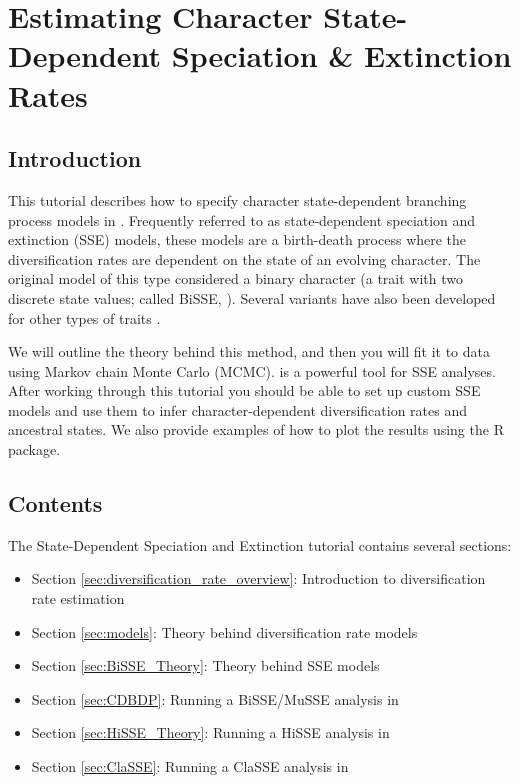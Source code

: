 \section*{Estimating Character State-Dependent Speciation \& Extinction Rates}

\subsection*{Introduction}

This tutorial describes how to specify character state-dependent branching process models in \RevBayes.
Frequently referred to as state-dependent speciation and extinction (SSE) models,
these models are a birth-death process where the diversification rates are dependent on the state of an evolving character.
The original model of this type considered a binary character (a trait with two discrete state values; called BiSSE, \citealt{Maddison2007}).
Several variants have also been developed for other types of traits \citep{FitzJohn2010, Goldberg2011, Goldberg2012, MagnusonFord2012, FitzJohn2012, Beaulieu2016, Freyman2017}.

We will outline the theory behind this method, and then you will fit it to data using Markov chain Monte Carlo (MCMC).
\RevBayes is a powerful tool for SSE analyses. After working through this tutorial you
should be able to set up custom SSE models and use them to
infer character-dependent diversification rates and ancestral states.
We also provide examples of how to plot the results using the \RevGadgets R package.

\subsection*{Contents}

The State-Dependent Speciation and Extinction tutorial contains several sections:

\begin{itemize}
\item Section \ref{sec:diversification_rate_overview}: Introduction to diversification rate estimation
\item Section \ref{sec:models}: Theory behind diversification rate models
\item Section \ref{sec:BiSSE_Theory}: Theory behind SSE models
\item Section \ref{sec:CDBDP}: Running a BiSSE/MuSSE analysis in \RevBayes
\item Section \ref{sec:HiSSE_Theory}: Running a HiSSE analysis in \RevBayes
\item Section \ref{sec:ClaSSE}: Running a ClaSSE analysis in \RevBayes
\end{itemize}

